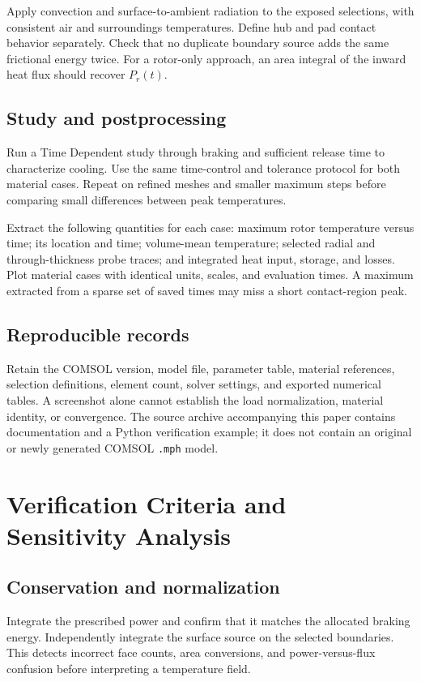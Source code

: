 \documentclass[11pt,a4paper]{article}
\newcommand{\sectionpage}[1]{\clearpage\section{#1}}
\begin{document}
Apply convection and surface-to-ambient radiation to the exposed selections, with consistent air and surroundings temperatures. Define hub and pad contact behavior separately. Check that no duplicate boundary source adds the same frictional energy twice. For a rotor-only approach, an area integral of the inward heat flux should recover $P_r(t)$.

\subsection{Study and postprocessing}
Run a Time Dependent study through braking and sufficient release time to characterize cooling. Use the same time-control and tolerance protocol for both material cases. Repeat on refined meshes and smaller maximum steps before comparing small differences between peak temperatures.

Extract the following quantities for each case: maximum rotor temperature versus time; its location and time; volume-mean temperature; selected radial and through-thickness probe traces; and integrated heat input, storage, and losses. Plot material cases with identical units, scales, and evaluation times. A maximum extracted from a sparse set of saved times may miss a short contact-region peak.

\subsection{Reproducible records}
Retain the COMSOL version, model file, parameter table, material references, selection definitions, element count, solver settings, and exported numerical tables. A screenshot alone cannot establish the load normalization, material identity, or convergence. The source archive accompanying this paper contains documentation and a Python verification example; it does not contain an original or newly generated COMSOL \texttt{.mph} model.

\sectionpage{Verification Criteria and Sensitivity Analysis}
\subsection{Conservation and normalization}
Integrate the prescribed power and confirm that it matches the allocated braking energy. Independently integrate the surface source on the selected boundaries. This detects incorrect face counts, area conversions, and power-versus-flux confusion before interpreting a temperature field.
\end{document}
